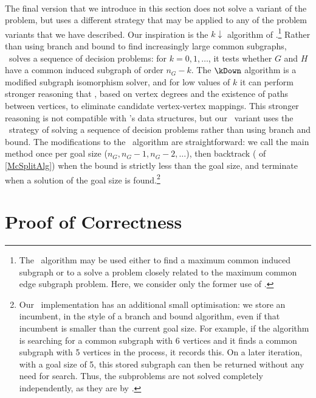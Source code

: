 \paragraph{\McSplitDown} The final version that we introduce in this section
does not solve a variant of the problem, but uses a different strategy
that may be applied to any of the problem variants that we have described.
Our inspiration is the $k{\downarrow}$ algorithm of
\citet{UpcomingAAAIPaper}.\footnote{The \kDown\ algorithm may be used
either to find a maximum common induced subgraph or to a solve a problem
closely related to the maximum common edge subgraph problem.  Here, we consider
only the former use of \kDown.}  Rather than using branch and bound to find
increasingly large common subgraphs, \kDown\ solves a sequence of decision problems:
for $k=0, 1, \dots$, it tests whether $G$ and $H$ have a common induced subgraph
of order $n_G-k$.  The $\kDown$ algorithm is a modified subgraph isomorphism solver,
and for low values of $k$ it can perform stronger reasoning that \McSplit,
based on vertex degrees and the existence of paths between vertices, to eliminate
candidate vertex-vertex mappings.  This stronger reasoning is not compatible
with \McSplit's data structures, but our \McSplitDown\ variant uses the \kDown\
strategy of solving a sequence of decision problems rather than using branch
and bound.
The modifications to the \McSplit\ algorithm are straightforward:
we call the main \FuncSty{McSplit} method once per goal size ($n_G, n_G-1, n_G-2,
\dots$), then backtrack (\lineref{PruneSearch} of \cref{McSplitAlg}) when the
bound is strictly less than the goal size, and terminate when a solution of the
goal size is found.\footnote{Our \McSplit\ implementation has an additional
small optimisation: we store an incumbent, in the style of a branch and bound
algorithm, even if that incumbent is smaller than the current goal size.
For example, if the algorithm is searching for a common subgraph with 6 vertices
and it finds a common subgraph with 5 vertices in the process, it records this.
On a later iteration, with a goal size of 5, this stored subgraph can then
be returned without any need for search.  Thus, the subproblems are not
solved completely independently, as they are by \kDown.}

\FloatBarrier

\section{Proof of Correctness}\label{sec:mcsplit-proof}

